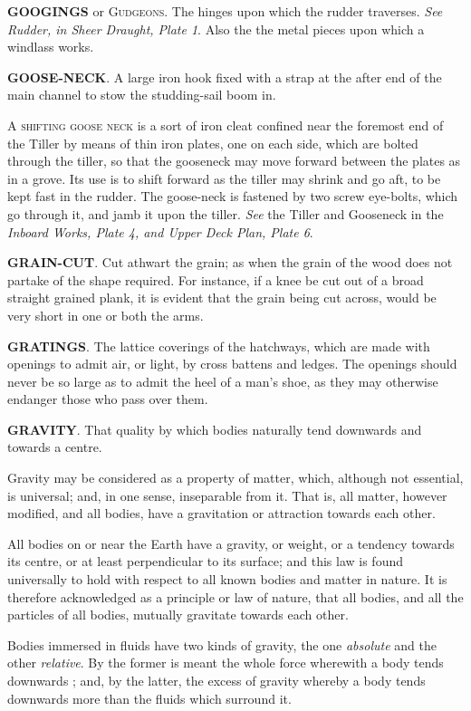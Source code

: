 \textbf{GOOGINGS} or \textsc{Gudgeons}. The hinges upon which the rudder traverses. \textit{See Rudder, in Sheer Draught, Plate 1}. Also the the metal pieces upon which a windlass works. 

\textbf{GOOSE-NECK}. A large iron hook fixed with a strap at the after end of the main channel to stow the studding-sail boom in. 

A \textsc{shifting goose neck} is a sort of iron cleat confined near the foremost end of the Tiller by means of thin iron plates, one on each side, which are bolted through the tiller, so that the gooseneck may move forward between the plates as in a grove. Its use is to shift forward as the tiller may shrink and go aft, to be kept fast in the rudder. The goose-neck is fastened by two screw eye-bolts, which go through it, and jamb it upon the tiller. \textit{See} the Tiller and Gooseneck in the \textit{Inboard Works, Plate 4, and Upper Deck Plan, Plate 6}. 

\textbf{GRAIN-CUT}. Cut athwart the grain; as when the grain of the wood does not partake of the shape required. For instance, if a knee be cut out of a broad straight grained plank, it is evident that the grain being cut across, would be very short in one or both the arms. 

\textbf{GRATINGS}. The lattice coverings of the hatchways, which are made with openings to admit air, or light, by cross battens and ledges. The openings should never be so large as to admit the heel of a man's shoe, as they may otherwise endanger those who pass over them. 

\textbf{GRAVITY}. That quality by which bodies naturally tend downwards and towards a centre.

Gravity may be considered as a property of matter, which, although not essential, is universal; and, in one sense, inseparable from it. That is, all matter, however modified, and all bodies, have a gravitation or attraction towards each other. 

All bodies on or near the Earth have a gravity, or weight, or a tendency towards its centre, or at least perpendicular to its surface; and this law is found universally to hold with respect to all known bodies and matter in nature. It is therefore acknowledged as a principle or law of nature, that all bodies, and all the particles of all bodies, mutually gravitate towards each other. 

Bodies immersed in fluids have two kinds of gravity, the one \textit{absolute} and the other \textit{relative}. By the former is meant the whole force wherewith a body tends downwards ; and, by the latter, the excess of gravity whereby a body tends downwards more than the fluids which surround it. 

